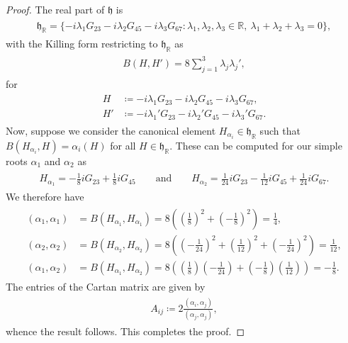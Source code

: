 \noindent\begin{proof} The real part of $\mathfrak{h}$ is
\begin{align*}
\begin{split}
\mathfrak{h}_\mathbb{R} = \{-i\lambda_1 G_{23} - i\lambda_2 G_{45} - i\lambda_3 G_{67} : \lambda_1, \lambda_2, \lambda_3 \in \mathbb{R},\ \!\lambda_1 + \lambda_2 + \lambda_3 = 0\},
\end{split}
\end{align*}
\noindent with the Killing form restricting to $\mathfrak{h}_\mathbb{R}$ as
\begin{align*}
\begin{split}
B(H, H') = 8\sum_{j=1}^3 \lambda_j\lambda_j',
\end{split}
\end{align*}
\noindent for
\begin{align*}
\begin{split}
H &\coloneqq -i\lambda_1 G_{23} - i\lambda_2 G_{45} - i\lambda_3 G_{67},\\
H' &\coloneqq -i\lambda_1' G_{23} - i\lambda_2' G_{45} - i\lambda_3' G_{67}.
\end{split}
\end{align*}
\noindent Now, suppose we consider the canonical element $H_{\alpha_i} \in \mathfrak{h}_\mathbb{R}$ such that $B(H_{\alpha_i}, H) = \alpha_i(H)$ for all $H \in \mathfrak{h}_\mathbb{R}$. These can be computed for our simple roots $\alpha_1$ and $\alpha_2$ as
\begin{align*}
\begin{split}
H_{\alpha_1} = -\frac{1}{8}iG_{23} + \frac{1}{8}iG_{45}\qquad\text{and}\qquad H_{\alpha_2} = \frac{1}{24}iG_{23} - \frac{1}{12}iG_{45} + \frac{1}{24}iG_{67}.
\end{split}
\end{align*}
\noindent We therefore have
\begin{align*}
\begin{split}
(\alpha_1, \alpha_1) &= B(H_{\alpha_1}, H_{\alpha_1}) = 8\left(\left(\frac{1}{8}\right)^2 + \left(-\frac{1}{8}\right)^2\right) = \frac{1}{4},\\
(\alpha_2, \alpha_2) &= B(H_{\alpha_2}, H_{\alpha_2}) = 8\left(\left(-\frac{1}{24}\right)^2 + \left(\frac{1}{12}\right)^2 + \left(-\frac{1}{24}\right)^2\right) = \frac{1}{12},\\
(\alpha_1, \alpha_2) &= B(H_{\alpha_1}, H_{\alpha_2}) = 8\left(\left(\frac{1}{8}\right)\left(-\frac{1}{24}\right) + \left(-\frac{1}{8}\right)\left(\frac{1}{12}\right)\right) = -\frac{1}{8}.
\end{split}
\end{align*}
\noindent The entries of the Cartan matrix are given by
\begin{align*}
\begin{split}
A_{ij} \coloneqq 2\frac{(\alpha_i, \alpha_j)}{(\alpha_j, \alpha_j)},
\end{split}
\end{align*}
\noindent whence the result follows. This completes the proof.
\end{proof}\\[\linespacing]

